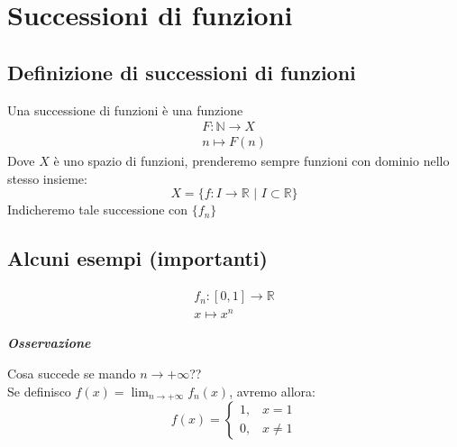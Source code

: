 \documentclass{article}
\theoremstyle{definition}
\newcommand{\R}{\mathbb{R}}
\newcommand{\N}{\mathbb{N}}
\begin{document}
\section{Successioni di funzioni}
\subsection{Definizione di successioni di funzioni}
Una successione di funzioni è una funzione
\begin{align}
    F: \N \to X \\
    n \mapsto F(n)
\end{align}
Dove $X$ è uno spazio di funzioni, prenderemo sempre funzioni con dominio nello stesso insieme:
\begin{equation}
    X=\{f: I \to \R \,\, | \,\, I \subset \R\}
\end{equation}
Indicheremo tale successione con $\{f_n\}$
\subsection{Alcuni esempi (importanti)}
\begin{align}
    f_n: [0,1] \to \R \\
    x \mapsto x^n
\end{align}
\begin{center}
    \textbf{\textit{Osservazione}}
\end{center}
Cosa succede se mando $n \to +\infty$??
\\
Se definisco $f(x)=\lim_{n \to +\infty} f_n(x)$, avremo allora:
\begin{equation}
    f(x)=\begin{cases}
        1, \,\,\,\,\, x=1 \\
        0, \,\,\,\,\, x \neq 1
    \end{cases}
\end{equation}
\end{document}

